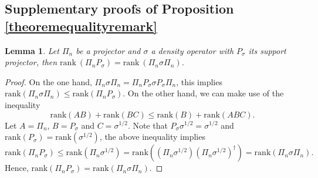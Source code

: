 \documentclass[11pt]{article}
\newtheorem{lemma}{Lemma}
\theoremstyle{definition}
\begin{document}
\begin{appendix}
\section{Supplementary proofs of Proposition \ref{theoremequalityremark}} \label{append1}

\begin{lemma}\label{rankequal}
Let $\Pi_n$ be a projector and $\sigma$ a density operator with $P_{\sigma}$ its support projector, then $\text{rank}~(\Pi_n P_{\sigma})=\text{rank}~(\Pi_n\sigma\Pi_n)$.
\end{lemma}
\begin{proof}
On the one hand, $\Pi_n\sigma\Pi_n=\Pi_n P_{\sigma}\sigma P_{\sigma} \Pi_n$, this implies $\text{rank}(\Pi_n\sigma\Pi_n)\leq\text{rank}(\Pi_n P_{\sigma})$. On the other hand, we can make use of the inequality
\begin{equation*}
\text{rank}(AB)+\text{rank}(BC)\leq\text{rank}(B)+\text{rank}(ABC).
\end{equation*}
Let $A=\Pi_n$, $B=P_{\sigma}$ and $C=\sigma^{1/2}$. Note that $P_{\sigma}\sigma^{1/2}=\sigma^{1/2}$ and $\text{rank}(P_\sigma)=\text{rank}(\sigma^{1/2})$, the above inequality implies
\begin{equation*}
    \text{rank}(\Pi_n P_{\sigma})\leq \text{rank}(\Pi_n\sigma^{1/2})=\text{rank}((\Pi_n\sigma^{1/2})(\Pi_n\sigma^{1/2})^{\dagger})=\text{rank}(\Pi_n\sigma\Pi_n).
\end{equation*}
Hence, $\text{rank}(\Pi_n P_{\sigma})=\text{rank}(\Pi_n\sigma\Pi_n)$.
\end{proof}


\end{appendix}
\end{document}
